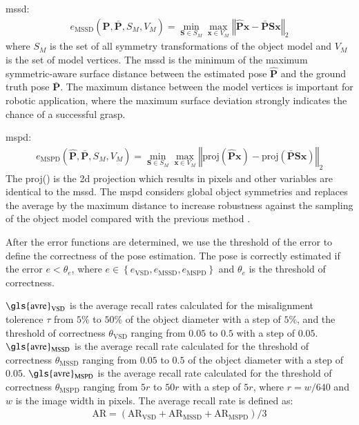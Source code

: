 \documentclass[12pt,DIV14,BCOR12mm,a4paper,footinclude=false,headinclude,parskip=half-,twoside,openright,cleardoublepage=empty,toc=index,bibliography=totoc,listof=totoc]{scrreprt}
\numberwithin{equation}{chapter}
\begin{document}
\gls{mssd}:
\begin{align}
  e_{\text{MSSD}}\left(\mathbf{\hat{P}},\mathbf{\bar{P}},S_{M},V_{M}\right)=\min_{\mathbf{S}\in S_{M}}\max_{\mathbf{x}\in V_{M}}\left\Vert \hat{\mathbf{P}}\mathbf{x}-\bar{\mathbf{P}}\mathbf{Sx}\right\Vert _{2} 
 \end{align}
where $S_{M}$ is the set of all symmetry transformations of the object model and $V_{M}$ is the set of model vertices. The \gls{mssd} is the minimum of the maximum symmetric-aware surface distance between the estimated pose $\mathbf{\hat{P}}$ and the ground truth pose $\mathbf{\bar{P}}$. The maximum distance between the model vertices is important for robotic application, where the maximum surface deviation strongly indicates the chance of a successful grasp.

\gls{mspd}:
\begin{align}
  e_{\text{MSPD}}\left(\mathbf{\hat{P}},\mathbf{\bar{P}},S_{M},V_{M}\right)=\min_{\mathbf{S}\in S_{M}}\max_{\mathbf{x}\in V_{M}}\left\Vert \text{proj}\left(\hat{\mathbf{P}}\mathbf{x}\right)-\text{proj}\left(\bar{\mathbf{P}}\mathbf{Sx}\right)\right\Vert _{2} 
 \end{align}
The proj() is the \gls{2d} projection which results in pixels and other variables are identical to the \gls{mssd}. The \gls{mspd} considers global object symmetries and replaces the average by the maximum distance to increase robustness against the sampling of the object model compared with the previous method \cite{7780735}.

After the error functions are determined, we use the threshold of the error to define the correctness of the pose estimation. The pose is correctly estimated if the error $e<\theta_{e}$, where $e\in \left\{e_{\text{VSD}},e_{\text{MSSD}},e_{\text{MSPD}}\right\}$ and $\theta_{e}$ is the threshold of correctness.

$\text{\gls{avre}}_{\text{VSD}}$ is the average recall rates calculated for the misalignment tolerence $\tau$ from $5\%$ to $50\%$ of the object diameter with a step of $5\%$, and the threshold of correctness $\theta_{\text{VSD}}$ ranging from $0.05$ to $0.5$ with a step of $0.05$. $\text{\gls{avre}}_{\text{MSSD}}$ is the average recall rate calculated for the threshold of correctness $\theta_{\text{MSSD}}$ ranging from $0.05$ to $0.5$ of the object diameter with a step of $0.05$. $\text{\gls{avre}}_{\text{MSPD}}$ is the average recall rate calculated for the threshold of correctness $\theta_{\text{MSPD}}$ ranging from $5r$ to $50r$ with a step of $5r$, where $r=w/640$ and $w$ is the image width in pixels. The average recall rate is defined as:
\begin{align}
  \text{AR}=\left(\text{AR}_{\text{VSD}}+\text{AR}_{\text{MSSD}}+\text{AR}_{\text{MSPD}}\right)/3
\end{align}
\end{document}
